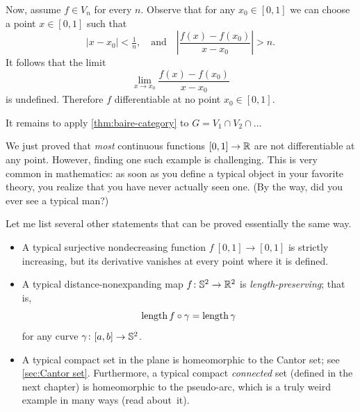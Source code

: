 Now, assume $f\in V_n$ for every $n$.
Observe that for any $x_0\in [0,1]$ we can choose a point $x\in [0,1]$ such that
\[|x-x_0|< \tfrac1n,
\quad\text{and}\quad
\left|\frac{f(x)-f(x_0)}{x-x_0}\right|>n.
\]
It follows that the limit
\[\lim_{x\to x_0}\frac{f(x)-f(x_0)}{x-x_0}\]
is undefined.
Therefore $f$ differentiable at no point $x_0\in [0,1]$.



It remains to apply \ref{thm:baire-category} to $G=V_1\cap V_2\cap\ldots$
\qeds

We just proved that \textit{most} continuous functions $[0,1]\z\to\RR$ are not differentiable at any point.
However, finding one such example is challenging.
This is very common in mathematics: as soon as you define a typical object
in your favorite theory, you realize that you have never actually seen one.
(By the way, did you ever see a typical man?)

Let me list several other statements that can be proved essentially the same way.
\begin{itemize}
\item A typical surjective nondecreasing function $f\:[0,1]\to[0,1]$ is strictly increasing, but its derivative vanishes at every point where it is defined.
\item A typical distance-nonexpanding map $f\:\SS^2\z\to\RR^2$ is \emph{length-preserving}; that is,
\[\mathrm{length\,} f\circ\gamma=\mathrm{length\,} \gamma\]
for any curve $\gamma\colon[a,b]\to \mathbb{S}^2$.
\item A typical compact set in the plane is homeomorphic to the Cantor set; see \ref{sec:Cantor set}.
Furthermore, a typical compact \textit{connected} set (defined in the next chapter) is homeomorphic to the pseudo-arc, which is a truly weird example in many ways (read about~it).
\end{itemize}

